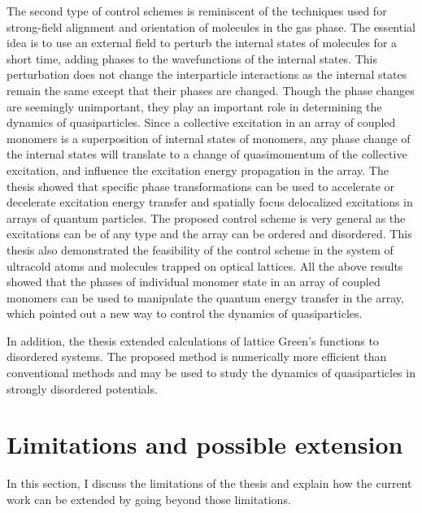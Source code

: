 The second type of control schemes is reminiscent of the techniques used for strong-field alignment and orientation of 
molecules in the gas phase\cite{alignment-review}. The essential idea is to use an external field to perturb the internal states
of molecules for a short time, adding phases to the wavefunctions of the internal states. This perturbation does not change
the interparticle interactions as the internal states remain the same except that their phases are changed. Though the phase
changes are seemingly unimportant, they play an important role in determining the dynamics of quasiparticles. Since a collective excitation in an array of coupled monomers is a superposition of internal states of monomers, any phase change
of the internal states will translate to a change of quasimomentum of  the collective excitation, and influence the excitation
energy propagation in the array. The thesis showed that specific phase transformations can be used to accelerate or 
decelerate excitation energy transfer and spatially focus delocalized excitations in arrays of quantum particles.  The 
proposed control scheme is very general as the excitations can be of any type and the array can be ordered and 
disordered. This thesis also demonstrated the feasibility of the control scheme in the system of ultracold atoms and 
molecules trapped on optical lattices. All the above results showed that the phases of individual monomer state in an array of coupled monomers can be used to manipulate the quantum energy transfer in the array, which 
pointed out a new way to control the dynamics of quasiparticles.  


In addition, the thesis extended calculations of lattice Green's functions to disordered systems. The proposed method
is  numerically more efficient than conventional methods and may be used to study the dynamics of quasiparticles in 
strongly disordered potentials. 

\section{Limitations and possible extension}
In this section, I discuss the limitations of the thesis and explain how the current work can be extended by going beyond those limitations. 

